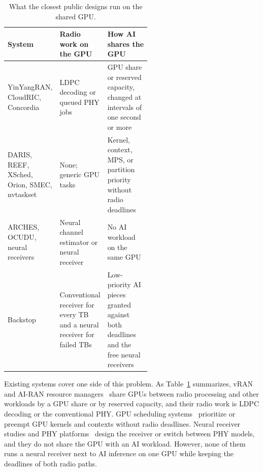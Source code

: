 \documentclass[acmsmall,screen,review,anonymous]{acmart}
\newcommand{\sys}{Backstop\xspace}
\begin{document}
\begin{table}[t]
\caption{What the closest public designs run on the shared GPU.}
\label{tab:closest}
\footnotesize
\begin{tabularx}{\linewidth}{@{}>{\raggedright\arraybackslash}p{0.25\linewidth}>{\raggedright\arraybackslash}p{0.31\linewidth}>{\raggedright\arraybackslash}X@{}}
\toprule
System & Radio work on the GPU & How AI shares the GPU \\
\midrule
YinYangRAN, CloudRIC, Concordia & LDPC decoding or queued PHY jobs & GPU share or reserved capacity, changed at intervals of one second or more \\
DARIS, REEF, XSched, Orion, SMEC, nvtaskset & None; generic GPU tasks & Kernel, context, MPS, or partition priority without radio deadlines \\
ARCHES, OCUDU, neural receivers & Neural channel estimator or neural receiver & No AI workload on the same GPU \\
\sys & Conventional receiver for every TB and a neural receiver for failed TBs & Low-priority AI pieces granted against both deadlines and the free neural receivers \\
\bottomrule
\end{tabularx}
\end{table}

Existing systems cover one side of this problem. As Table~\ref{tab:closest} summarizes, vRAN and AI-RAN
resource managers~\cite{yinyangran,cloudric,concordia,interplay,caora,haf,distributedairan} share GPUs
between radio processing and other workloads by a GPU share or by reserved capacity, and their radio work is
LDPC decoding or the conventional PHY. GPU scheduling systems~\cite{daris,reef,xsched,orion,smec,nvtaskset}
prioritize or preempt GPU kernels and contexts without radio deadlines. Neural receiver studies and PHY
platforms~\cite{deeprx,nrx5g,nrxrt,arches,ocudu} design the receiver or switch between PHY models, and they
do not share the GPU with an AI workload. However, none of them runs a neural receiver next to AI inference
on one GPU while keeping the deadlines of both radio paths.
\end{document}
